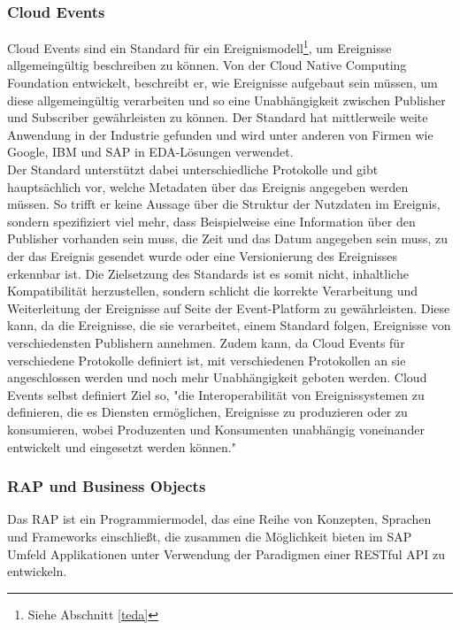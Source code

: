 \subsubsection*{Cloud Events}
\label{cloudev}
Cloud Events sind ein Standard für ein Ereignismodell\footnote{Siehe Abschnitt \ref*{teda}}, um Ereignisse allgemeingültig beschreiben zu können. Von der Cloud Native Computing Foundation entwickelt, beschreibt er, wie Ereignisse aufgebaut sein müssen, um diese allgemeingültig verarbeiten und so eine Unabhängigkeit zwischen Publisher und Subscriber gewährleisten zu können. Der Standard hat mittlerweile weite Anwendung in der Industrie gefunden und wird unter anderen von Firmen wie Google, IBM und SAP in \ac{EDA}-Lösungen verwendet. \citepls \\
Der Standard unterstützt dabei unterschiedliche Protokolle und gibt hauptsächlich vor, welche Metadaten über das Ereignis angegeben werden müssen. So trifft er keine Aussage über die Struktur der Nutzdaten im Ereignis, sondern spezifiziert viel mehr, dass Beispielweise eine Information über den Publisher vorhanden sein muss, die Zeit und das Datum angegeben sein muss, zu der das Ereignis gesendet wurde oder eine Versionierung des Ereignisses erkennbar ist. Die Zielsetzung des Standards ist es somit nicht, inhaltliche Kompatibilität herzustellen, sondern schlicht die korrekte Verarbeitung und Weiterleitung der Ereignisse auf Seite der Event-Platform zu gewährleisten. Diese kann, da die Ereignisse, die sie verarbeitet, einem Standard folgen, Ereignisse von verschiedensten Publishern annehmen. Zudem kann, da Cloud Events für verschiedene Protokolle definiert ist, mit verschiedenen Protokollen an sie angeschlossen werden und noch mehr Unabhängigkeit geboten werden. Cloud Events selbst definiert Ziel so, "die Interoperabilität von Ereignissystemen zu definieren, die es Diensten ermöglichen, Ereignisse zu produzieren oder zu konsumieren, wobei Produzenten und Konsumenten unabhängig voneinander entwickelt und eingesetzt werden können."\citepls

\subsubsection*{RAP und Business Objects}
Das \ac{RAP} ist ein Programmiermodel, das eine Reihe von Konzepten, Sprachen und Frameworks einschließt, die zusammen die Möglichkeit bieten im SAP Umfeld Applikationen unter Verwendung der Paradigmen einer \ac*{REST}ful \ac{API} zu entwickeln. \citepls

